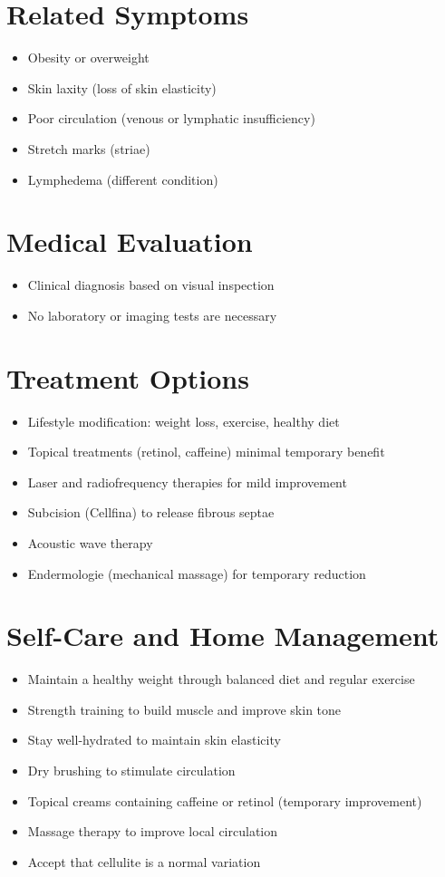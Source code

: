 \section*{Related Symptoms}
\begin{itemize}
\item Obesity or overweight
\item Skin laxity (loss of skin elasticity)
\item Poor circulation (venous or lymphatic insufficiency)
\item Stretch marks (striae)
\item Lymphedema (different condition)
\end{itemize}

\section*{Medical Evaluation}
\begin{itemize}
\item Clinical diagnosis based on visual inspection
\item No laboratory or imaging tests are necessary
\end{itemize}

\section*{Treatment Options}
\begin{itemize}
\item Lifestyle modification: weight loss, exercise, healthy diet
\item Topical treatments (retinol, caffeine) minimal temporary benefit
\item Laser and radiofrequency therapies for mild improvement
\item Subcision (Cellfina) to release fibrous septae
\item Acoustic wave therapy
\item Endermologie (mechanical massage) for temporary reduction
\end{itemize}
\section*{Self-Care and Home Management}
\begin{itemize}
\item Maintain a healthy weight through balanced diet and regular exercise
\item Strength training to build muscle and improve skin tone
\item Stay well-hydrated to maintain skin elasticity
\item Dry brushing to stimulate circulation
\item Topical creams containing caffeine or retinol (temporary improvement)
\item Massage therapy to improve local circulation
\item Accept that cellulite is a normal variation
\end{itemize}

